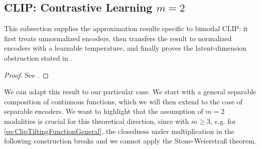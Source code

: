 \documentclass{article}
\begin{document}
\subsection{CLIP: Contrastive Learning $m=2$}
This subsection supplies the approximation results specific to
 bimodal CLIP: it first treats unnormalized encoders, then transfers the result
 to normalized encoders with a learnable temperature, and finally proves the
 latent-dimension obstruction stated in
 .

\begin{proof}
 See \cite[Thm. VIII.4.7]{wernerFunktionalanalysis2011}.
\end{proof}
We can adapt this result to our particular case. We start with a general
separable composition of continuous functions, which we will then
extend to the case of separable encoders.
We want to highlight that the assumption of $m=2$ modalities is crucial for this
theoretical direction, since with $m\geq 3$,
e.g. for \eqref{eq:ClipTiltingFunctionGeneral},
the closedness under multiplication
in the following construction breaks and we cannot apply the Stone-Weierstraß
theorem.
\end{document}
